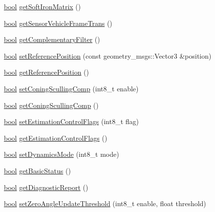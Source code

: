\begin{DoxyCompactItemize}
\hyperlink{classbool}{bool} \hyperlink{classcl__microstrain__mips__client_1_1ClMicrostainMips_a85478a03dfe9d5e28accc8297221b6f8}{get\+Soft\+Iron\+Matrix} ()
\item 
\hyperlink{classbool}{bool} \hyperlink{classcl__microstrain__mips__client_1_1ClMicrostainMips_af63311d03fa0fbc80ef3b371d478800a}{get\+Sensor\+Vehicle\+Frame\+Trans} ()
\item 
\hyperlink{classbool}{bool} \hyperlink{classcl__microstrain__mips__client_1_1ClMicrostainMips_ac95fa15b81f4922a89c8f6d92f0a7f19}{get\+Complementary\+Filter} ()
\item 
\hyperlink{classbool}{bool} \hyperlink{classcl__microstrain__mips__client_1_1ClMicrostainMips_a25325ba1eab9b814af9a8da88321adc9}{set\+Reference\+Position} (const geometry\+\_\+msgs\+::\+Vector3 \&position)
\item 
\hyperlink{classbool}{bool} \hyperlink{classcl__microstrain__mips__client_1_1ClMicrostainMips_af4dbb307eab8d8d0789edd4f03759132}{get\+Reference\+Position} ()
\item 
\hyperlink{classbool}{bool} \hyperlink{classcl__microstrain__mips__client_1_1ClMicrostainMips_afa84e71187f508c5a9633d0f2b22d607}{set\+Coning\+Sculling\+Comp} (int8\+\_\+t enable)
\item 
\hyperlink{classbool}{bool} \hyperlink{classcl__microstrain__mips__client_1_1ClMicrostainMips_a069b069b6f523ebac07864223db957ba}{get\+Coning\+Sculling\+Comp} ()
\item 
\hyperlink{classbool}{bool} \hyperlink{classcl__microstrain__mips__client_1_1ClMicrostainMips_aa990dbc678b59be9fbfe4578c36fa3ef}{set\+Estimation\+Control\+Flags} (int8\+\_\+t flag)
\item 
\hyperlink{classbool}{bool} \hyperlink{classcl__microstrain__mips__client_1_1ClMicrostainMips_a7d24069842ced7e11068d59e75cbecdb}{get\+Estimation\+Control\+Flags} ()
\item 
\hyperlink{classbool}{bool} \hyperlink{classcl__microstrain__mips__client_1_1ClMicrostainMips_aa1282aee0d7a0c61304dd83d75bea1ea}{set\+Dynamics\+Mode} (int8\+\_\+t mode)
\item 
\hyperlink{classbool}{bool} \hyperlink{classcl__microstrain__mips__client_1_1ClMicrostainMips_a5a2dc242b88b59b1dd45aa74a9c9556e}{get\+Basic\+Status} ()
\item 
\hyperlink{classbool}{bool} \hyperlink{classcl__microstrain__mips__client_1_1ClMicrostainMips_afacc1edf3d543f7c26ec262304c84959}{get\+Diagnostic\+Report} ()
\item 
\hyperlink{classbool}{bool} \hyperlink{classcl__microstrain__mips__client_1_1ClMicrostainMips_a19203314a51241aa5f0b2be24c5bf8ee}{set\+Zero\+Angle\+Update\+Threshold} (int8\+\_\+t enable, float threshold)

\end{DoxyCompactItemize}
